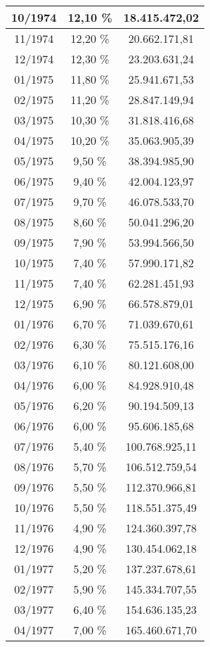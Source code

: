\begin{center}
\begin{longtable}{|c|c|c|}
10/1974 & 12,10 \% & 18.415.472,02 \\ \hline
11/1974 & 12,20 \% & 20.662.171,81 \\ \hline
12/1974 & 12,30 \% & 23.203.631,24 \\ \hline
01/1975 & 11,80 \% & 25.941.671,53 \\ \hline
02/1975 & 11,20 \% & 28.847.149,94 \\ \hline
03/1975 & 10,30 \% & 31.818.416,68 \\ \hline
04/1975 & 10,20 \% & 35.063.905,39 \\ \hline
05/1975 & 9,50 \% & 38.394.985,90 \\ \hline
06/1975 & 9,40 \% & 42.004.123,97 \\ \hline
07/1975 & 9,70 \% & 46.078.533,70 \\ \hline
08/1975 & 8,60 \% & 50.041.296,20 \\ \hline
09/1975 & 7,90 \% & 53.994.566,50 \\ \hline
10/1975 & 7,40 \% & 57.990.171,82 \\ \hline
11/1975 & 7,40 \% & 62.281.451,93 \\ \hline
12/1975 & 6,90 \% & 66.578.879,01 \\ \hline
01/1976 & 6,70 \% & 71.039.670,61 \\ \hline
02/1976 & 6,30 \% & 75.515.176,16 \\ \hline
03/1976 & 6,10 \% & 80.121.608,00 \\ \hline
04/1976 & 6,00 \% & 84.928.910,48 \\ \hline
05/1976 & 6,20 \% & 90.194.509,13 \\ \hline
06/1976 & 6,00 \% & 95.606.185,68 \\ \hline
07/1976 & 5,40 \% & 100.768.925,11 \\ \hline
08/1976 & 5,70 \% & 106.512.759,54 \\ \hline
09/1976 & 5,50 \% & 112.370.966,81 \\ \hline
10/1976 & 5,50 \% & 118.551.375,49 \\ \hline
11/1976 & 4,90 \% & 124.360.397,78 \\ \hline
12/1976 & 4,90 \% & 130.454.062,18 \\ \hline
01/1977 & 5,20 \% & 137.237.678,61 \\ \hline
02/1977 & 5,90 \% & 145.334.707,55 \\ \hline
03/1977 & 6,40 \% & 154.636.135,23 \\ \hline
04/1977 & 7,00 \% & 165.460.671,70 \\ \hline

\end{longtable}
\end{center}
